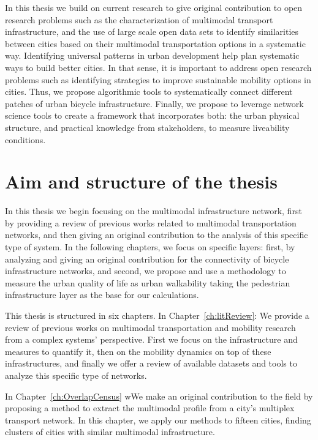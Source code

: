 In this thesis we build on current research to give original contribution to open research problems such as the characterization of multimodal transport infrastructure, and the use of large scale open data sets to identify similarities between cities based on their multimodal transportation options in a systematic way.
Identifying universal patterns in urban development help plan systematic ways to build better cities. In that sense, it is important to address open research problems such as identifying strategies to improve sustainable mobility options in cities. Thus, we propose algorithmic tools to systematically connect different patches of urban bicycle infrastructure. Finally, we propose to leverage network science tools to create a framework that incorporates both: the urban physical structure, and practical knowledge from stakeholders, to measure liveability conditions.

\section{Aim and structure of the thesis}

In this thesis we begin focusing on the multimodal infrastructure network, first by providing a review of previous works related to multimodal transportation networks, and then giving an original contribution to the analysis of this specific type of system. In the following chapters, we focus on specific layers: first, by analyzing and giving an original contribution for the connectivity of bicycle infrastructure networks, and second, we propose and use a methodology to measure the urban quality of life as urban walkability taking the pedestrian infrastructure layer as the base for our calculations.

This thesis is structured in six chapters. In Chapter~\ref{ch:litReview}: We provide a review of previous works on multimodal transportation and mobility research from a complex systems' perspective. First we focus on the infrastructure and measures to quantify it, then on the mobility dynamics on top of these infrastructures, and finally we offer a review of available datasets and tools to analyze this specific type of networks.

In Chapter~\ref{ch:OverlapCensus} wWe make an original contribution to the field by proposing a method to extract the multimodal profile from a city's multiplex transport network. In this chapter, we apply our methods to fifteen cities, finding clusters of cities with similar multimodal infrastructure.

